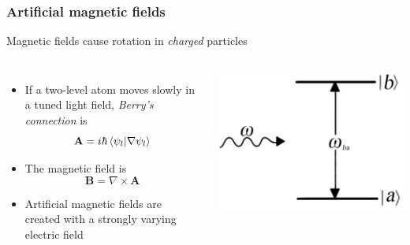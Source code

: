 \documentclass{beamer}
\begin{document}
\begin{frame}
\frametitle{Artificial magnetic fields}
\begin{center}
Magnetic fields cause rotation in \textit{charged} particles
\end{center}
\begin{columns}
\begin{itemize}
\item If a two-level atom moves slowly in a tuned light field, \textit{Berry's connection} is
$$
\mathbf{A} = i\hbar\braket{\psi_l | \nabla\psi_l}
$$
\item The magnetic field is
$$
\mathbf{B} = \nabla \times \mathbf{A}
$$
\item Artificial magnetic fields are created with a strongly varying electric field
\end{itemize}
\includegraphics[width=\textwidth]{2level.jpg}
\end{columns}
\end{frame}
\end{document}
